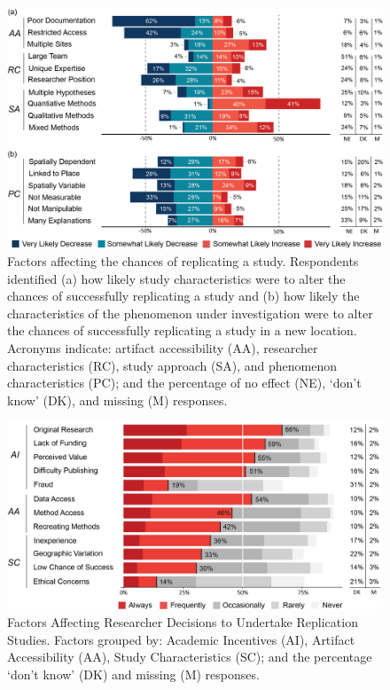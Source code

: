 \documentclass[]{interact}
\theoremstyle{plain}%
\theoremstyle{definition}
\theoremstyle{remark}
\begin{document}
\newpage

\begin{figure}[hbt!]
    \centering
    \includegraphics[scale=0.8]{results/figures/Fig3-Q8-10-Chances.png}
    \caption{Factors affecting the chances of replicating a study. Respondents identified (a) how likely study characteristics were to alter the chances of successfully replicating a study and (b) how likely the characteristics of the phenomenon under investigation were to alter the chances of successfully replicating a study in a new location. Acronyms indicate: artifact accessibility (AA), researcher characteristics (RC), study approach (SA), and phenomenon characteristics (PC); and the percentage of no effect (NE), `don't know' (DK), and missing (M) responses.}
    \label{fig:Q8-10-Chances}
\end{figure}

\newpage

\begin{figure}[hbt!]
    \centering
    \includegraphics[scale=0.8]{results/figures/Fig4-Q15-Decisions.png}
    \caption{Factors Affecting Researcher Decisions to Undertake Replication Studies. Factors grouped by: Academic Incentives (AI), Artifact Accessibility (AA), Study Characteristics (SC); and the percentage `don't know' (DK) and missing (M) responses.}
    \label{fig:Q15-DecisionFactors}
\end{figure}
\end{document}
